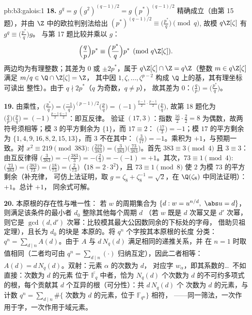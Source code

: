 \begin{solution}{pb:b3:galois:1}
\textbf{18.} $g^q = g\,(g^2)^{(q-1)/2} = g\,(p^*)^{(q-1)/2}$
精确成立（由第 15 题），并由 $\Z$ 中的欧拉判别法给出
$(p^*)^{(q-1)/2} \equiv \bigl(\frac{p^*}q\bigr) \pmod q$,
故模 $q\Z[\zeta]$ 有 $g^q \equiv \bigl(\frac{p^*}q\bigr)g$。
与第 17 题比较并乘以 $g$：
\[
\Bigl(\frac qp\Bigr)p^* \equiv \Bigl(\frac{p^*}q\Bigr)p^*
\pmod{q\Z[\zeta]} .
\]
两边均为有理整数；其差为 $0$ 或
$\pm2p^*$，属于 $q\Z[\zeta] \cap \Z = q\Z$（整数 $m
\in q\Z[\zeta]$ 满足 $m/q \in \Q \cap \Z[\zeta] = \Z$，
其中因 $1, \zeta, \dots, \zeta^{p-2}$ 构成
$\Q$ 上的基，其有理坐标可读出
整性）。由于 $q \nmid 2p^*$（$q$ 为奇数，$q \neq p$），
故其差为 $0$：$\bigl(\frac qp\bigr) =
\bigl(\frac{p^*}q\bigr)$。

\textbf{19.} 由乘性，$\bigl(\frac{p^*}q\bigr) =
\bigl(\frac{-1}q\bigr)^{(p-1)/2}\bigl(\frac pq\bigr) =
(-1)^{\frac{q-1}2\cdot\frac{p-1}2}\bigl(\frac pq\bigr)$,
故第 18 题化为 $\bigl(\frac qp\bigr)\bigl(\frac
pq\bigr) = (-1)^{\frac{p-1}2\frac{q-1}2}$：即互反律。
验证 $(17, 3)$：指数 $\frac{16}2\cdot\frac22 = 8$
为偶数，故两符号须相等；模 $3$ 的平方剩余为 $\{1\}$，而 $17 \equiv 2$：
$\bigl(\frac{17}3\bigr) = -1$；模 $17$ 的平方剩余为 $\{1, 4,
9, 16, 8, 2, 15, 13\}$，而 $3$ 不在其中：
$\bigl(\frac3{17}\bigr) = -1$。乘积为 $+1$，与预期一致。对 $x^2
\equiv 219 \pmod{383}$: $\bigl(\frac{219}{383}\bigr) =
\bigl(\frac3{383}\bigr)\bigl(\frac{73}{383}\bigr)$。首先
$383 \equiv 3 \pmod4$ 且 $3 \equiv 3$：由互反律得
$\bigl(\frac3{383}\bigr) = -\bigl(\frac{383}3\bigr) =
-\bigl(\frac23\bigr) = -(-1) = +1$。其次，$73 \equiv 1
\pmod 4$: $\bigl(\frac{73}{383}\bigr) =
\bigl(\frac{383}{73}\bigr) = \bigl(\frac{18}{73}\bigr) =
\bigl(\frac2{73}\bigr)$（$18 = 2\cdot3^2$），且 $73 \equiv 1
\pmod 8$ 使 $2$ 为模 $73$ 的平方剩余（补充律，
可仿上法证明，取 $g = \zeta_8 + \zeta_8^{-1} = \sqrt2$，在
$\Q(\zeta_8)$ 中同法证明）：$+1$。总计 $+1$，
同余式可解。

\textbf{20.} 本原根的存在性与唯一性：
若 $w$ 的周期集合为 $\{d : w = u^{n/d},\ \abs u = d\}$，
则满足该条件的最小者 $d_0$ 整除其他每个周期 $d$
（若 $w$ 既是 $d$ 次幂又是 $d'$ 次幂，则它是
$\gcd(d, d')$ 次幂：比较模其最大公因数同余的下标处的字母，
借助贝祖定理），且长为 $d_0$ 的块是
本原的。将 $q^n$ 个字按其本原根的长度
分类：$q^n = \sum_{d \mid n}A(d)$。由于 $A$ 与
$d\,N_q(d)$ 满足相同的递推关系，并
在 $n = 1$ 时取值相同（二者均可由 $q^n
= \sum_{d\mid n}(\cdot)$ 归纳互定），因此二者相等：$A(d) =
d\,N_q(d)$。双射：元素 $\alpha$ 的次数为 $d$，
对应字 $w_\alpha$，即其系数的\dots\
不如直接：次数为 $d$ 的元素
位于 $\overline{\mathbb F_q}$ 中者，恰为 $N_q(d)$
个次数为 $d$ 的不可约多项式的根，每个贡献其 $d$
个互异的根（可分性）：共 $d\,N_q(d)$ 个
次数为 $d$ 的元素，与计数 $q^n = \sum_{d\mid n}\#\{
\text{ 次数为 } d \text{ 的元素，位于 } \mathbb F_{q^n}\}$ 相符，
——同一筛法，一次作用于字，一次作用于域元素。


\end{solution}

